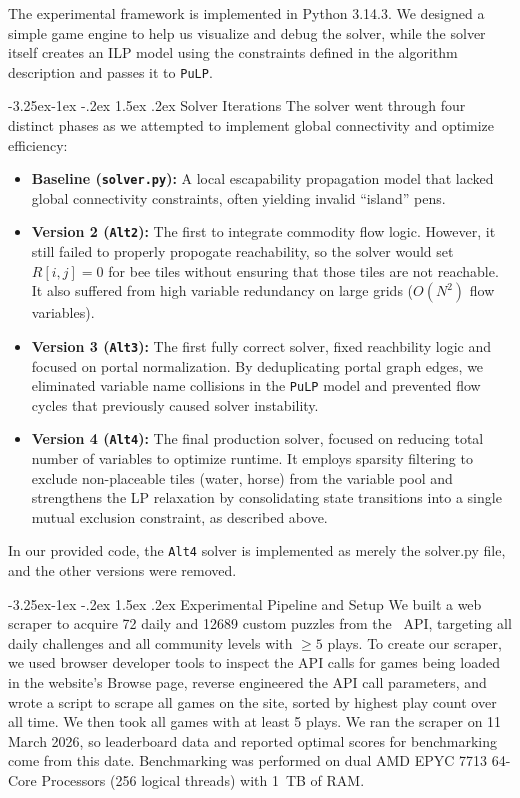 \documentclass[sigconf,nonacm]{acmart}
\makeatletter
\renewcommand{\subsection}{\@startsection{subsection}{2}{\z@}%
  {-3.25ex\@plus -1ex \@minus -.2ex}%
  {1.5ex \@plus .2ex}%
  {\reset@font\large\bfseries}}
\makeatother
\begin{document}
The experimental framework is implemented in Python 3.14.3. We designed a simple game engine to help us visualize and debug the solver, while the solver itself creates an ILP model using the constraints defined in the algorithm description and passes it to \texttt{PuLP}.

\subsection{Solver Iterations}
The solver went through four distinct phases as we attempted to implement global connectivity and optimize efficiency:
\begin{itemize}
    \item \textbf{Baseline (\texttt{solver.py}):} A local escapability propagation model that lacked global connectivity constraints, often yielding invalid ``island'' pens.
    \item \textbf{Version 2 (\texttt{Alt2}):} The first to integrate commodity flow logic. However, it still failed to properly propogate reachability, so the solver would set $R[i,j]=0$ for bee tiles without ensuring that those tiles are not reachable. It also suffered from high variable redundancy on large grids ($O(N^2)$ flow variables).
    \item \textbf{Version 3 (\texttt{Alt3}):} The first fully correct solver, fixed reachbility logic and focused on portal normalization. By deduplicating portal graph edges, we eliminated variable name collisions in the \texttt{PuLP} model and prevented flow cycles that previously caused solver instability.
    \item \textbf{Version 4 (\texttt{Alt4}):} The final production solver, focused on reducing total number of variables to optimize runtime. It employs sparsity filtering to exclude non-placeable tiles (water, horse) from the variable pool and strengthens the LP relaxation by consolidating state transitions into a single mutual exclusion constraint, as described above.
\end{itemize}

In our provided code, the \texttt{Alt4} solver is implemented as merely the solver.py file, and the other versions were removed.

\subsection{Experimental Pipeline and Setup}
We built a web scraper to acquire 72 daily and 12689 custom puzzles from the \horse\ API, targeting all daily challenges and all community levels with $\geq 5$ plays. To create our scraper, we used browser developer tools to inspect the API calls for games being loaded in the website's Browse page, reverse engineered the API call parameters, and wrote a script to scrape all games on the site, sorted by highest play count over all time. We then took all games with at least 5 plays. We ran the scraper on 11 March 2026, so leaderboard data and reported optimal scores for benchmarking come from this date. Benchmarking was performed on dual AMD EPYC 7713 64-Core Processors (256 logical threads) with 1~TB of RAM.
\end{document}
